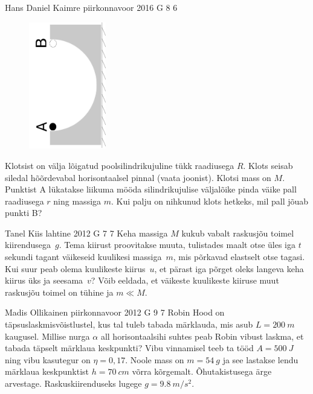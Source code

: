 \documentclass[11pt]{article}
\begin{document}
{%
{Hans Daniel Kaimre} %
{piirkonnavoor} %
{2016} %
{G 8} %
{6} %
{
\ifStatement
\begin{figure}
	\vspace{-15pt}
	\includegraphics[angle=-90,origin=c,width=0.3\textwidth]{2016-v2g-08-halfpipe.pdf}
\end{figure}
Klotsist on välja lõigatud poolsilindrikujuline tükk raadiusega $R$. Klots seisab siledal hõõrdevabal horisontaalsel pinnal (vaata joonist). Klotsi mass on $M$. Punktist A lükatakse liikuma mööda silindrikujulise väljalõike pinda väike pall raadiusega $r$ ning massiga $m$. Kui palju on nihkunud klots hetkeks, mil pall jõuab punkti B?
\fi
}

{Tanel Kiis} %
{lahtine} %
{2012} %
{G 7} %
{7} %
{
\ifStatement
Keha massiga $M$ kukub vabalt raskusjõu toimel kiirendusega~$g$. Tema
kiirust proovitakse muuta, tulistades maalt otse üles iga $t$ sekundi tagant
väikeseid kuulikesi massiga~$m$, mis põrkavad elastselt otse tagasi.
Kui suur peab olema kuulikeste kiirus~$u$, et pärast iga põrget oleks langeva
keha kiirus üks ja seesama~$v$? Võib eeldada, et väikeste kuulikeste kiiruse muut raskusjõu toimel on
tühine ja $m\ll M$.
\fi
}

{Madis Ollikainen} %
{piirkonnavoor} %
{2012} %
{G 9} %
{7} %
{
\ifStatement
Robin Hood on täpsuslaskmisvõistlustel, kus tal tuleb tabada märklauda, mis asub
$L=\SI{200}{m}$ kaugusel. Millise nurga $\alpha$ all horisontaalsihi suhtes
peab Robin vibust laskma, et tabada täpselt märklaua keskpunkti? Vibu vinnamisel
teeb ta tööd $A=\SI{500}{J}$ ning vibu kasutegur on $\eta=0,17$. Noole mass on
$m=\SI{54}{g}$ ja see lastakse lendu märklaua keskpunktist $h=\SI{70}{cm}$ võrra
kõrgemalt. Õhutakistusega ärge arvestage. Raskuskiirenduseks lugege
$g=\SI{9,8}{m/s^2}$.
\fi
}

}
\end{document}
